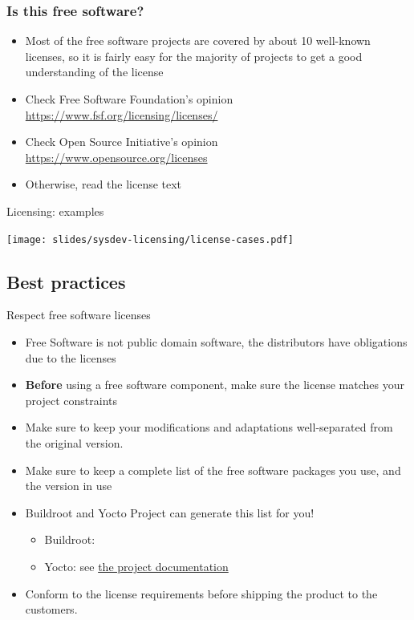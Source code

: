 \begin{frame}
  \frametitle{Is this free software?}
  \begin{itemize}
  \item Most of the free software projects are covered by about 10
    well-known licenses, so it is fairly easy for the majority of
    projects to get a good understanding of the license
  \item Check Free Software Foundation's opinion\\
    \url{https://www.fsf.org/licensing/licenses/}
  \item Check Open Source Initiative's opinion\\
    \url{https://www.opensource.org/licenses}
  \item Otherwise, read the license text
  \end{itemize}
\end{frame}

\begin{frame}{Licensing: examples}
  \begin{center}
    \texttt{[image: slides/sysdev-licensing/license-cases.pdf]}
  \end{center}
\end{frame}

\subsection{Best practices}

\begin{frame}{Respect free software licenses}
  \begin{itemize}
  \item Free Software is not public domain software, the distributors
    have obligations due to the licenses
  \item {\bf Before} using a free software component, make sure the
    license matches your project constraints
  \item Make sure to keep your modifications and adaptations
    well-separated from the original version.
  \item Make sure to keep a complete list of the free software
    packages you use, and the version in use
  \item Buildroot and Yocto Project can generate this list for you!
    \begin{itemize}
    \item Buildroot: 
    \item Yocto: see
      \href{https://docs.yoctoproject.org/dev-manual/common-tasks.html\#maintaining-open-source-license-compliance-during-your-product-s-lifecycle}{the
        project documentation}
    \end{itemize}
  \item Conform to the license requirements before shipping the
    product to the customers.
  \end{itemize}
\end{frame}

